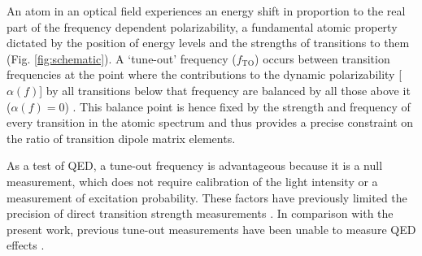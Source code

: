 \documentclass[12pt]{article}
\begin{document}
An atom in an optical field experiences an energy shift in proportion to the real part of the frequency dependent polarizability, a fundamental atomic property dictated by the position of energy levels and the strengths of transitions to them (Fig. \ref{fig:schematic}). 
A ‘tune-out’ frequency ($f_\mathrm{TO}$) occurs between transition frequencies at the point where the contributions to the dynamic polarizability [$\alpha(f)$] by all transitions below that frequency are balanced by all those above it ($\alpha(f)=0$) \cite{PhysRevA.75.053612}. 
This balance point is hence fixed by the strength and frequency of every transition in the atomic spectrum and thus provides a precise constraint on the ratio of transition dipole matrix elements. 

As a test of QED, a tune-out frequency is advantageous because it is a null measurement, which does not require calibration of the light intensity or a measurement of excitation probability. These factors have previously limited the precision of direct transition strength measurements \cite{Bouloufa_2009,Vogt2007,PhysRevLett.125.013002}. In comparison with the present work, previous tune-out measurements have been unable to measure QED effects \cite{PhysRevA.92.052501,PhysRevLett.109.243004,PhysRevA.93.022507,PhysRevLett.109.243003,PhysRevLett.115.043004}.
\end{document}
